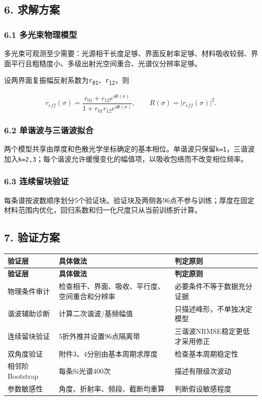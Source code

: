 \documentclass[11pt,a4paper]{ctexart}
\begin{document}
\subsection*{6. 求解方案}
\subsubsection*{6.1 多光束物理模型}
多光束可观测至少需要：光源相干长度足够、界面反射率足够、材料吸收较弱、界面平行且粗糙度小、多级出射光空间重合、光谱仪分辨率足够。


设两界面复振幅反射系数为\texttt{r\textsubscript{0}\textsubscript{1}}、\texttt{r\textsubscript{1}\textsubscript{2}}，则


\[
r_{eff}(\sigma)=\frac{r_{01}+r_{12}e^{i\Phi(\sigma)}}
{1+r_{01}r_{12}e^{i\Phi(\sigma)}},
\qquad R(\sigma)=|r_{eff}(\sigma)|^2.
\]
\subsubsection*{6.2 单谐波与三谐波拟合}
两个模型共享由厚度和色散光学坐标确定的基本相位。单谐波只保留\texttt{k=1}，三谐波加入\texttt{k=2,3}；每个谐波允许缓慢变化的幅值项，以吸收包络而不改变相位频率。


\subsubsection*{6.3 连续留块验证}
每条谱按波数顺序划分5个验证块。验证块及两侧各96点不参与训练；厚度在固定材料范围内优化，回归系数和归一化尺度只从当前训练折计算。


\subsection*{7. 验证方案}
\begin{center}
\scriptsize
\begin{longtable}{|>{\raggedright\arraybackslash}p{}|>{\raggedright\arraybackslash}p{}|>{\raggedright\arraybackslash}p{}|}
\hline
\textbf{验证层} & \textbf{具体做法} & \textbf{判定原则} \\ \hline
\endfirsthead
\hline \textbf{验证层} & \textbf{具体做法} & \textbf{判定原则} \\ \hline
\endhead
物理条件审计 & 检查相干、界面、吸收、平行度、空间重合和分辨率 & 必要条件不等于数据充分证据 \\ \hline
谐波辅助诊断 & 计算二次谐波/基频幅值 & 只描述峰形，不单独决定模型 \\ \hline
连续留块验证 & 5折外推并设置96点隔离带 & 三谐波NRMSE稳定更低才采用修正 \\ \hline
双角度验证 & 附件3、4分别由基本周期求厚度 & 检查基本周期稳定性 \\ \hline
相邻阶Bootstrap & 每条Si光谱400次 & 描述有限级次波动 \\ \hline
参数敏感性 & 角度、折射率、频段、截断均重算 & 判断假设敏感程度 \\ \hline
\end{longtable}
\normalsize
\end{center}
\end{document}
